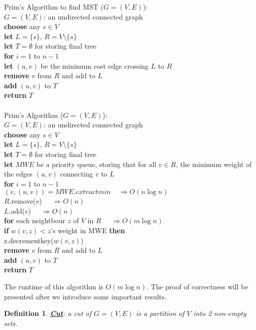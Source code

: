 \documentclass[twoside]{article}
\newcommand{\pc}[1]{\mbox{\textbf{#1}}} %
\newtheorem{protodefinition}[prototheorem]{Definition}
\newenvironment{definition}
{\colorlet{shadecolor}{cyan!15}\begin{shaded}\begin{protodefinition}\normalfont}
		{\end{protodefinition}\end{shaded}}
\begin{document}
\begin{algorithme}
	Prim's Algorithm to find MST ($G = (V, E)$):\\
	$G = (V, E)$: an undirected connected graph\\
	\>\pc{choose} any $s \in V$\\
	\>\pc{let} $L = \{s\}$, $R = V \setminus \{s\}$\\
	\>\pc{let} $T = \emptyset$ for storing final tree\\
	\>\pc{for} $i = 1$ to $n-1$\\
	\>\>\pc{let} $(u, v)$ be the minimum cost edge crossing $L$ to $R$\\
	\>\>\pc{remove} $v$ from $R$ and add to $L$\\
	\>\>\pc{add} $(u, v)$ to $T$\\
	\>\pc{return} $T$\\
	\\
	Prim's Algorithm ($G = (V, E)$):\\
	$G = (V, E)$: an undirected connected graph\\
	\>\pc{choose} any $s \in V$\\
	\>\pc{let} $L = \{s\}$, $R = V \setminus \{s\}$\\
	\>\pc{let} $T = \emptyset$ for storing final tree\\
	\>\pc{let} $MWE$ be a priority queue, storing that for all $v \in R$, the minimum weight of the edges $(u,v)$ connecting $v$ to $L$\\
	\>\pc{for} $i = 1$ to $n-1$\\
	\>\>$(v, (u, v)) = MWE.extractmin$$\;\;\;\;\Rightarrow O(n\log n)$\\
	\>\>$R$.remove($v$) $\;\;\;\;\Rightarrow O(n)$\\
	\>\>$L$.add($v$) $\;\;\;\;\Rightarrow O(n)$\\
	\>\>\pc{for} each neightbour $z$ of $V$ in $R$ $\;\;\;\;\Rightarrow O(m\log n)$\\
	\>\>\>\pc{if} $w(v,z) < z$'s weight in MWE \pc{then}\\
	\>\>\>\>z.decrementkey($w(v,z)$)\\
	\>\>\pc{remove} $v$ from $R$ and add to $L$\\
	\>\>\pc{add} $(u, v)$ to $T$\\
	\>\pc{return} $T$
\end{algorithme}
The runtime of this algorithm is $O(m\log n)$. The proof of correctness will be presented after we introduce some important results. 
\begin{definition}
	\textbf{\underline{Cut}}: a cut of $G= (V, E)$ is a partition of $V$ into 2 non-empty sets. 
\end{definition}
\end{document}
